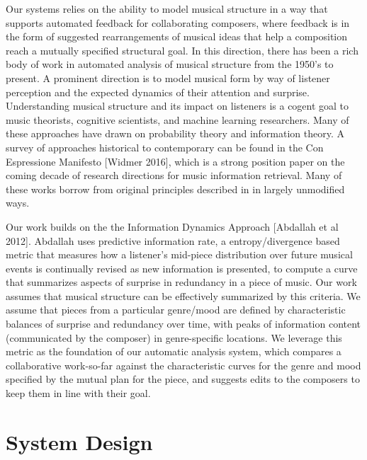 \documentclass[final,authoryear,5p,times,twocolumn]{elsarticle}
\begin{document}
Our systems relies on the ability to model musical structure in a way that supports automated feedback for collaborating composers, where feedback is in the form of suggested rearrangements of musical ideas that help a composition reach a mutually specified structural goal. In this direction, there has been a rich body of work in automated analysis of musical structure from the 1950's to present. A prominent direction is to model musical form by way of listener perception and the expected dynamics of their attention and surprise. Understanding musical structure and its impact on listeners is a cogent goal to music theorists, cognitive scientists, and machine learning researchers. Many of these approaches have drawn on probability theory and information theory. A survey of approaches historical to contemporary can be found in the Con Espressione Manifesto [Widmer 2016], which is a strong position paper on the coming decade of research directions for music information retrieval. Many of these works borrow from original principles described in \cite{shannon} in largely unmodified ways.

Our work builds on the the Information Dynamics Approach [Abdallah et al 2012]. Abdallah uses predictive information rate, a entropy/divergence based metric that measures how a listener's mid-piece distribution over future musical events is continually revised as new information is presented, to compute a curve that summarizes aspects of surprise in redundancy in a piece of music. Our work assumes that musical structure can be effectively summarized by this criteria. We assume that pieces from a particular genre/mood are defined by characteristic balances of surprise and redundancy over time, with peaks of information content (communicated by the composer) in genre-specific locations. We leverage this metric as the foundation of our automatic analysis system, which compares a collaborative work-so-far against the characteristic curves for the genre and mood specified by the mutual plan for the piece, and suggests edits to the composers to keep them in line with their goal.


\section{System Design}
\end{document}
